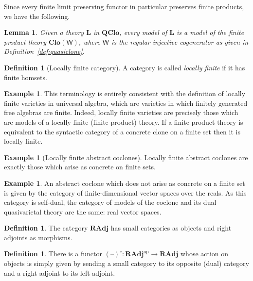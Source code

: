 \documentclass[11pt, a4paper, twoside,leqno]{amsart}
\newcommand{\cat}[1]{\mathbf{#1}}
\newcommand{\thg}{{\mathord{\text{--}}}}
\numberwithin{equation}{section}
\theoremstyle{plain}
\newtheorem{Lemma}[Thm]{Lemma}
\theoremstyle{definition}
\newtheorem{Defn}[Thm]{Definition}
\newtheorem{Ex}[Thm]{Example}
\begin{document}
Since every finite limit preserving functor in particular preserves
finite products, we have the following.
\begin{Lemma}
  \label{lem:model-Qclo-Clo}
  Given a theory \(\cat{L}\) in \(\cat{QClo}\), every model of
\(\cat{L}\) is a model of the finite product theory
\(\cat{Clo}(\mathsf{W})\), where \(\mathsf{W}\) is the regular
injective cogenerator as given in Definition~\ref{def:quasiclone}.
\end{Lemma}

\begin{Defn}[Locally finite category]
  \label{def:lfc}
  A category is called \emph{locally
    finite} if it has finite homsets.
\end{Defn}
  \begin{Ex}
    \label{ex:abs-coclo-loc-fin}
    This terminology is entirely consistent with the definition of locally
  finite varieties in universal algebra, which are varieties in which
  finitely generated free algebras are finite. Indeed, locally finite
  varieties are precisely those which are models of a locally finite
  (finite product) theory. If a finite product theory is equivalent to the syntactic category
  of a concrete clone on a finite set then it is locally finite.  
  \end{Ex}
\begin{Ex}[Locally finite abstract coclones]
  \label{ex:loc-fin-arc}
  Locally finite abstract coclones are exactly those which
  arise as concrete on finite sets. 
\end{Ex}

\begin{Ex}%
  \label{ex:vector-space}
  An abstract coclone which does not arise as 
  concrete on a finite set is given by the category
  of finite-dimensional vector spaces over the reals. As this category
  is self-dual, the category of models of the coclone and its
  dual quasivarietal theory are the same: real vector spaces. 
\end{Ex}


\begin{Defn}
  \label{def:rad-cat}
  The category \(\cat{RAdj}\) has small categories as objects and right
  adjoints as morphisms.
\end{Defn}

\begin{Defn}
  \label{def:func-o}
  There is a functor \((\thg)^{\circ} \colon \cat{RAdj} ^{\mathrm{op}} \rightarrow \cat{RAdj}\) whose
  action on objects is simply given by sending a small category to its
  opposite (dual) category and a right adjoint to its left adjoint.
\end{Defn}
\end{document}
